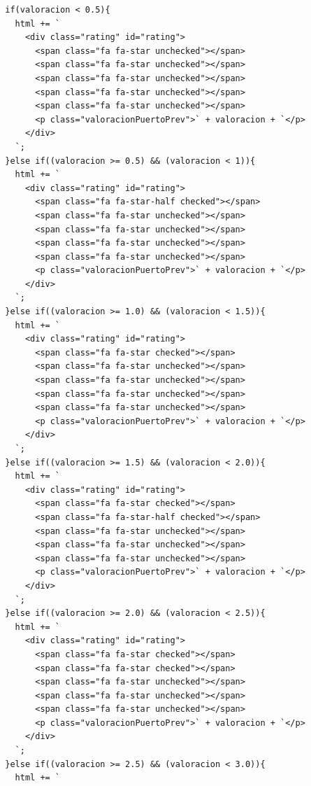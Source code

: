 \documentclass{article}
\begin{document}
\begin{itemize}
\begin{verbatim}
        if(valoracion < 0.5){
          html += `
            <div class="rating" id="rating">
              <span class="fa fa-star unchecked"></span>
              <span class="fa fa-star unchecked"></span>
              <span class="fa fa-star unchecked"></span>
              <span class="fa fa-star unchecked"></span>
              <span class="fa fa-star unchecked"></span>
              <p class="valoracionPuertoPrev">` + valoracion + `</p>
            </div>
          `;
        }else if((valoracion >= 0.5) && (valoracion < 1)){
          html += `
            <div class="rating" id="rating">
              <span class="fa fa-star-half checked"></span>
              <span class="fa fa-star unchecked"></span>
              <span class="fa fa-star unchecked"></span>
              <span class="fa fa-star unchecked"></span>
              <span class="fa fa-star unchecked"></span>
              <p class="valoracionPuertoPrev">` + valoracion + `</p>
            </div>
          `;
        }else if((valoracion >= 1.0) && (valoracion < 1.5)){
          html += `
            <div class="rating" id="rating">
              <span class="fa fa-star checked"></span>
              <span class="fa fa-star unchecked"></span>
              <span class="fa fa-star unchecked"></span>
              <span class="fa fa-star unchecked"></span>
              <span class="fa fa-star unchecked"></span>
              <p class="valoracionPuertoPrev">` + valoracion + `</p>
            </div>
          `;
        }else if((valoracion >= 1.5) && (valoracion < 2.0)){
          html += `
            <div class="rating" id="rating">
              <span class="fa fa-star checked"></span>
              <span class="fa fa-star-half checked"></span>
              <span class="fa fa-star unchecked"></span>
              <span class="fa fa-star unchecked"></span>
              <span class="fa fa-star unchecked"></span>
              <p class="valoracionPuertoPrev">` + valoracion + `</p>
            </div>
          `;
        }else if((valoracion >= 2.0) && (valoracion < 2.5)){
          html += `
            <div class="rating" id="rating">
              <span class="fa fa-star checked"></span>
              <span class="fa fa-star checked"></span>
              <span class="fa fa-star unchecked"></span>
              <span class="fa fa-star unchecked"></span>
              <span class="fa fa-star unchecked"></span>
              <p class="valoracionPuertoPrev">` + valoracion + `</p>
            </div>
          `;
        }else if((valoracion >= 2.5) && (valoracion < 3.0)){
          html += `

\end{verbatim}
\end{itemize}
\end{document}
